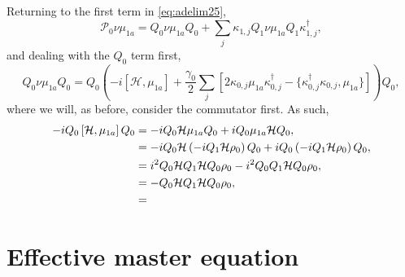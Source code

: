 Returning to the first term in \cref{eq:adelim25},
\begin{equation}
	\mathcal{P}_{0}\nu\mu_{1a} = Q_{0}\nu\mu_{1a}Q_{0} + \sum_{j}\kappa_{1,j}Q_{1}\nu\mu_{1a}Q_{1}\kappa_{1,j}^{\dagger}, 
	\label{eq:adelim30}
\end{equation}
and dealing with the \(Q_{0}\) term first,
\begin{equation}
	Q_{0}\nu\mu_{1a}Q_{0} = Q_{0}\left( -i\left[ \mathcal{H}, \mu_{1a} \right] + \frac{\gamma_{0}}{2} \sum_{j}\left[2\kappa_{0,j}\mu_{1a}\kappa_{0,j}^{\dagger} - \{\kappa_{0,j}^{\dagger}\kappa_{0,j}, \mu_{1a}\} \right] \right)Q_{0},
	\label{eq:adelim31}
\end{equation}
where we will, as before, consider the commutator first. As such,
\begin{align}
	-iQ_{0}\left[\mathcal{H}, \mu_{1a} \right]Q_{0} &= -iQ_{0}\mathcal{H}\mu_{1a}Q_{0} + iQ_{0}\mu_{1a}\mathcal{H}Q_{0}, \notag \\
	&=-iQ_{0}\mathcal{H}\left( -iQ_{1}\mathcal{H}\rho_{0} \right)Q_{0} + iQ_{0}\left( -iQ_{1}\mathcal{H}\rho_{0} \right)Q_{0}, \notag \\
	&= i^{2}Q_{0}\mathcal{H}Q_{1}\mathcal{H}Q_{0}\rho_{0} - i^{2}Q_{0}Q_{1}\mathcal{H}Q_{0}\rho_{0}, \notag \\
	&= -Q_{0}\mathcal{H}Q_{1}\mathcal{H}Q_{0}\rho_{0}, \notag \\
	&=  
	\label{eq:adelim32}
\end{align}

\section{Effective master equation}